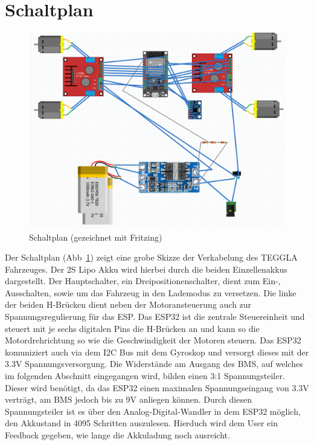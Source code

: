 \section{Schaltplan}
\begin{figure}[!ht]
	\centering
	\includegraphics[width=\textwidth]{bilder/schaltplan.png}
	\caption{Schaltplan (gezeichnet mit Fritzing)}
	\label{bild:schaltpaln}
\end{figure}
Der Schaltplan (Abb~\ref{bild:schaltpaln}) zeigt eine grobe Skizze der Verkabelung des TEGGLA Fahrzeuges. Der 2S Lipo Akku wird hierbei durch die beiden Einzellenakkus dargestellt.
Der Hauptschalter, ein Dreipositionenschalter, dient zum Ein-, Ausschalten, sowie um das Fahrzeug in den Lademodus zu versetzen. 
Die linke der beiden H-Brücken dient neben der Motoransteuerung auch zur Spannungsregulierung für das ESP. 
Das ESP32 ist die zentrale Steuereinheit und steuert mit je sechs digitalen Pins die H-Brücken an und kann so die Motordrehrichtung so wie die Geschwindigkeit der Motoren steuern.
Das ESP32 komuniziert auch via dem I2C Bus mit dem Gyroskop und versorgt dieses mit der 3.3V Spannungsversorgung.
Die Widerstände am Ausgang des BMS, auf welches im folgenden Abschnitt eingegangen wird, bilden einen 3:1 Spannungsteiler.
Dieser wird benötigt, da das ESP32 einen maximalen Spannungseingang von 3.3V verträgt, am BMS jedoch bis zu 9V anliegen können. Durch diesen Spannungsteiler ist es über den Analog-Digital-Wandler in dem ESP32 möglich, den Akkustand in 4095 Schritten auszulesen.
Hierduch wird dem User ein Feedback gegeben, wie lange die Akkuladung noch ausreicht.

